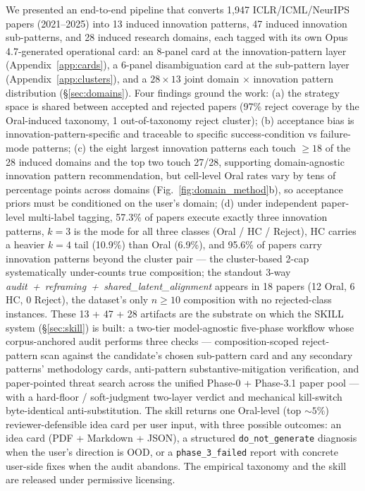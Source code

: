 \documentclass[10pt,a4paper]{article}
\begin{document}
We presented an end-to-end pipeline that converts 1{,}947 ICLR/ICML/NeurIPS papers (2021--2025) into 13 induced innovation patterns, 47 induced innovation sub-patterns, and 28 induced research domains, each tagged with its own Opus 4.7-generated operational card: an 8-panel card at the innovation-pattern layer (Appendix~\ref{app:cards}), a 6-panel disambiguation card at the sub-pattern layer (Appendix~\ref{app:clusters}), and a $28 \times 13$ joint domain $\times$ innovation pattern distribution (\S\ref{sec:domains}). Four findings ground the work: (a) the strategy space is shared between accepted and rejected papers (97\% reject coverage by the Oral-induced taxonomy, 1 out-of-taxonomy reject cluster); (b) acceptance bias is innovation-pattern-specific and traceable to specific success-condition vs failure-mode patterns; (c) the eight largest innovation patterns each touch $\geq 18$ of the 28 induced domains and the top two touch 27/28, supporting domain-agnostic innovation pattern recommendation, but cell-level Oral rates vary by tens of percentage points across domains (Fig.~\ref{fig:domain_method}b), so acceptance priors must be conditioned on the user's domain; (d) under independent paper-level multi-label tagging, 57.3\% of papers execute exactly three innovation patterns, \(k{=}3\) is the mode for all three classes (Oral / HC / Reject), HC carries a heavier \(k{=}4\) tail (10.9\%) than Oral (6.9\%), and 95.6\% of papers carry innovation patterns beyond the cluster pair --- the cluster-based 2-cap systematically under-counts true composition; the standout 3-way \emph{audit~+~reframing~+~shared\_latent\_alignment} appears in 18 papers (12 Oral, 6 HC, 0 Reject), the dataset's only \(n \geq 10\) composition with no rejected-class instances. These 13 + 47 + 28 artifacts are the substrate on which the SKILL system (\S\ref{sec:skill}) is built: a two-tier model-agnostic five-phase workflow whose corpus-anchored audit performs three checks --- composition-scoped reject-pattern scan against the candidate's chosen sub-pattern card and any secondary patterns' methodology cards, anti-pattern substantive-mitigation verification, and paper-pointed threat search across the unified Phase-0 + Phase-3.1 paper pool --- with a hard-floor / soft-judgment two-layer verdict and mechanical kill-switch byte-identical anti-substitution. The skill returns one Oral-level (top $\sim 5\%$) reviewer-defensible idea card per user input, with three possible outcomes: an idea card (PDF + Markdown + JSON), a structured \texttt{do\_not\_generate} diagnosis when the user's direction is OOD, or a \texttt{phase\_3\_failed} report with concrete user-side fixes when the audit abandons. The empirical taxonomy and the skill are released under permissive licensing.
\end{document}
